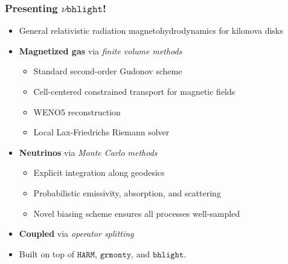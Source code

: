\documentclass[]{beamer}
\begin{document}
\begin{frame}
  \frametitle{Presenting $\nu\texttt{bhlight}$!}
  \begin{itemize}
  \item General relativistic radiation magnetohydrodynamics for kilonova disks
  \item \textbf{Magnetized gas} via \textit{finite volume methods}
    \begin{itemize}
    \item Standard second-order Gudonov scheme
    \item Cell-centered constrained transport for magnetic fields
    \item WENO5 reconstruction
    \item Local Lax-Friedrichs Riemann solver
    \end{itemize}
  \item \textbf{Neutrinos} via \textit{Monte Carlo methods}
    \begin{itemize}
    \item Explicit integration along geodesics
    \item Probabilistic emissivity, absorption, and scattering
    \item Novel biasing scheme ensures all processes well-sampled
    \end{itemize}
  \item \textbf{Coupled} via \textit{operator splitting}
  \item Built on top of $\texttt{HARM}$, $\texttt{grmonty}$, and
    $\texttt{bhlight}$.
  \end{itemize}
\end{frame}
\end{document}
